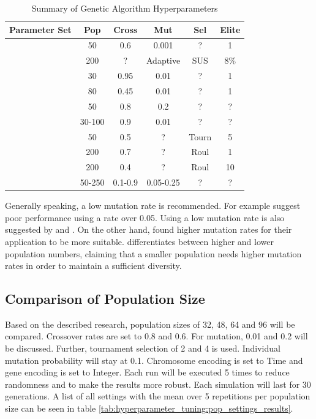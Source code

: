 \begin{table}[ht]
	\centering
	\caption{Summary of Genetic Algorithm Hyperparameters}
	\label{tab:hyperparameter_tuning:ga_hyperparameters}
	\begin{tabular}{lccccc}
		\hline
		\textbf{Parameter Set} & \textbf{Pop} & \textbf{Cross} & \textbf{Mut} & \textbf{Sel} & \textbf{Elite} \\
		\hline
		\cite{de_jong_analysis_1975} & 50 & 0.6 & 0.001 & ? & 1 \\
		\cite{mills_determining_2015} & 200 & ? & Adaptive & SUS & 8\% \\
		\cite{grefenstette_optimization_1986} & 30 & 0.95 & 0.01 & ? & 1 \\
		\cite{grefenstette_optimization_1986} & 80 & 0.45 & 0.01 & ? & 1 \\
		\cite{almanee_scenorita_2021} & 50 & 0.8 & 0.2 & ? & ? \\
		\cite{srinivas_genetic_1994}  & 30-100 & 0.9 & 0.01 & ? & ? \\
		\cite{fazal_estimating_2005} & 50 & 0.5 & ? & Tourn & 5 \\
		\cite{dao_maximising_2016} & 200 & 0.7 & ? & Roul & 1 \\
		\cite{naruka_parameter_2019} & 200 & 0.4 & ? & Roul & 10 \\
		\cite{jinghui_zhong_comparison_2005} & 50-250 & 0.1-0.9 & 0.05-0.25 & ? & ? \\
		\hline
	\end{tabular}
\end{table}

Generally speaking, a low mutation rate is recommended. For example \cite{grefenstette_optimization_1986} suggest poor performance using a rate over 0.05. Using a low mutation rate is also suggested by \cite{whitley_genetic_1994} and \cite{jinghui_zhong_comparison_2005}. On the other hand, \cite{boyabatli_parameter_2004} found higher mutation rates for their application to be more suitable. \cite{srinivas_genetic_1994} differentiates between higher and lower population numbers, claiming that a smaller population needs higher mutation rates in order to maintain a sufficient diversity.



\subsection{Comparison of Population Size}
Based on the described research, population sizes of 32, 48, 64 and 96 will be compared. Crossover rates are set to 0.8 and 0.6. For mutation, 0.01 and 0.2 will be discussed. Further, tournament selection of 2 and 4 is used.
Individual mutation probability will stay at 0.1. Chromosome encoding is set to Time and gene encoding is set to Integer. 
Each run will be executed 5 times to reduce randomness and to make the results more robust. Each simulation will last for 30 generations. A list of all settings with the mean over 5 repetitions per population size can be seen in table \ref{tab:hyperparameter_tuning:pop_settings_results}.

